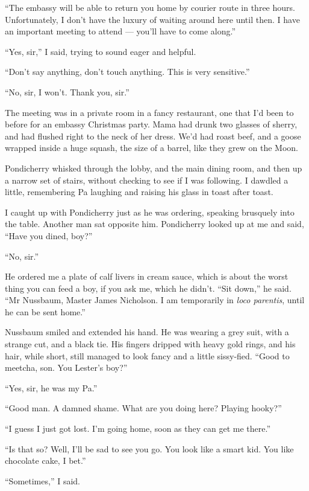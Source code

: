 ``The embassy will be able to return you home by courier route in three hours. 
Unfortunately, I don't have the luxury of waiting around here until then. I 
have an important meeting to attend --- you'll have to come along.''

``Yes, sir,'' I said, trying to sound eager and helpful.

``Don't say anything, don't touch anything. This is very sensitive.''

``No, sir, I won't. Thank you, sir.''

\tb

The meeting was in a private room in a fancy restaurant, one that
I'd been to before for an embassy Christmas party. Mama had drunk
two glasses of sherry, and had flushed right to the neck of her
dress. We'd had roast beef, and a goose wrapped inside a huge
squash, the size of a barrel, like they grew on the Moon.

Pondicherry whisked through the lobby, and the main dining room,
and then up a narrow set of stairs, without checking to see if I
was following. I dawdled a little, remembering Pa laughing and
raising his glass in toast after toast.

I caught up with Pondicherry just as he was ordering, speaking
brusquely into the table. Another man sat opposite him. Pondicherry
looked up at me and said, ``Have you dined, boy?''

``No, sir.''

He ordered me a plate of calf livers in cream sauce, which is about
the worst thing you can feed a boy, if you ask me, which he didn't.
``Sit down,'' he said.
``Mr Nussbaum, Master James Nicholson. I am temporarily in \emph{loco 
parentis}, until he can be sent home.''

Nussbaum smiled and extended his hand. He was wearing a grey suit,
with a strange cut, and a black tie. His fingers dripped with heavy
gold rings, and his hair, while short, still managed to look fancy
and a little sissy-fied.
``Good to meetcha, son. You Lester's boy?''

``Yes, sir, he was my Pa.''

``Good man. A damned shame. What are you doing here? Playing hooky?''

``I guess I just got lost. I'm going home, soon as they can get me there.''

``Is that so? Well, I'll be sad to see you go. You look like a smart kid. You 
like chocolate cake, I bet.''

``Sometimes,'' I said.

